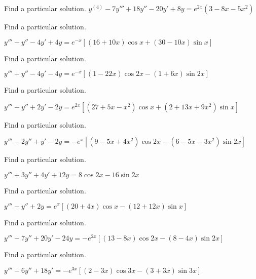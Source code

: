\documentclass{ximera}
\begin{document}
\begin{problem}\label{exer:9.3.28}   Find a particular solution.   $y^{(4)}-7y'''+18y''-20y'+8y=e^{2x}(3-8x-5x^2)$
\end{problem}

\begin{problem}\label{exer:9.3.29}   Find a particular solution.

$y'''-y''-4y'+4y=e^{-x}\left[(16+10x)\cos
x+(30-10x)\sin x\right]$
\end{problem}

\begin{problem}\label{exer:9.3.30}   Find a particular solution.

$y'''+y''-4y'-4y=e^{-x}\left[(1-22x)\cos
2x-(1+6x)\sin2x\right]$
\end{problem}

\begin{problem}\label{exer:9.3.31}   Find a particular solution.

$y'''-y''+2y'-2y=e^{2x}[(27+5x-x^2)\cos
x+(2+13x+9x^2)\sin x]$
\end{problem}

\begin{problem}\label{exer:9.3.32}   Find a particular solution.

$y'''-2y''+y'-2y=-e^x[(9-5x+4x^2)\cos
2x-(6-5x-3x^2)\sin2x]$
\end{problem}

\begin{problem}\label{exer:9.3.33}   Find a particular solution.

$y'''+3y''+4y'+12y=8\cos2x-16\sin2x$
\end{problem}

\begin{problem}\label{exer:9.3.34}   Find a particular solution. 

$y'''-y''+2y=e^x[(20+4x)\cos x-(12+12x)\sin
 x]$
\end{problem}
 
\begin{problem}\label{exer:9.3.35}   Find a particular solution.

$y'''-7y''+20y'-24y=-e^{2x}[(13-8x)\cos
2x-(8-4x)\sin2x]$
\end{problem}

\begin{problem}\label{exer:9.3.36}   Find a particular solution. 

$y'''-6y''+18y'=-e^{3x}[(2-3x)\cos
3x-(3+3x)\sin3x]$
\end{problem}
\end{document}
